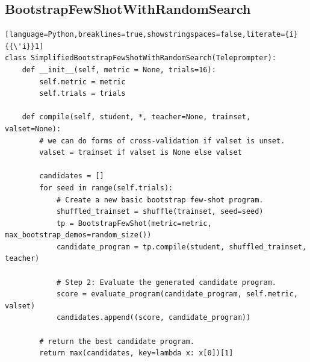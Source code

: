 \subsection{BootstrapFewShotWithRandomSearch}\label{code:BootstrapFewShotWithRandomSearch}
\begin{lstlisting}[language=Python,breaklines=true,showstringspaces=false,literate={í}{{\'i}}1]
class SimplifiedBootstrapFewShotWithRandomSearch(Teleprompter):
    def __init__(self, metric = None, trials=16):
        self.metric = metric
        self.trials = trials

    def compile(self, student, *, teacher=None, trainset, valset=None):
        # we can do forms of cross-validation if valset is unset.
        valset = trainset if valset is None else valset

        candidates = []
        for seed in range(self.trials):
            # Create a new basic bootstrap few-shot program.
            shuffled_trainset = shuffle(trainset, seed=seed)
            tp = BootstrapFewShot(metric=metric, max_bootstrap_demos=random_size())
            candidate_program = tp.compile(student, shuffled_trainset, teacher)

            # Step 2: Evaluate the generated candidate program.
            score = evaluate_program(candidate_program, self.metric, valset)
            candidates.append((score, candidate_program))

        # return the best candidate program.
        return max(candidates, key=lambda x: x[0])[1]
\end{lstlisting}

\clearpage
